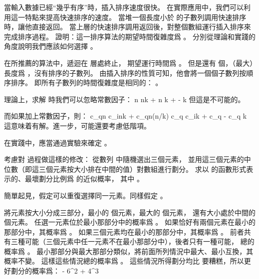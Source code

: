 \startEXERCISE
當輸入數據已經“幾乎有序”時，插入排序速度很快。
在實際應用中，我們可以利用這一特點來提高快速排序的速度。
當堆一個長度小於  的子數列調用快速排序時，讓他直接返回。
當上層的快速排序調用返回後，對整個數組運行插入排序來完成排序過程。
證明：這一排序算法的期望時間復雜度爲 。
分別從理論和實踐的角度說明我們應該如何選擇 。
\stopEXERCISE

\startANSWER
在所推薦的算法中，遞迴在  層處終止，
期望運行時間爲 。
但是還有  個，（最大）長度爲 ，沒有排序的子數列。
由插入排序的性質可知，他會將一個個子數列按順序排序。
即所有子數列的時間復雜度是相同的： 。

理論上，求解  時我們可以忽略常數因子：
\startformula\startmathalignment[n=1]
\NC n \ge nk + n \NR
\NC \Downarrow \NR
\NC {} \ge k +  -  \NR
\NC \Downarrow \NR
\NC {} \ge k \NR
\stopmathalignment\stopformula
但這是不可能的。

而如果加上常數因子，則：
\startformula\startmathalignment[n=1]
\NC c_qn \ge c_ink + c_qn\lg(n/k) \NR
\NC \Downarrow \NR
\NC c_q \ge c_ik + c_q - c_q \NR
\NC \Downarrow \NR
\NC {} \ge {}k \NR
\stopmathalignment\stopformula
這意味着有解。進一步，可能還要考慮低階項。

在實踐中，應當通過實驗來確定 。
\stopANSWER

考慮對  過程做這樣的修改：
從數列  中隨機選出三個元素，
並用這三個元素的中位數（即這三個元素按大小排在中間的值）對數組進行劃分。
求以 \m{\alpha} 的函數形式表示的、最壞劃分比例爲  的近似概率，
其中 。
\stopEXERCISE

\startANSWER
簡單起見，假定可以重復選擇同一元素。同樣假定 。

將元素按大小分成三部分，最小的  個元素，最大的  個元素，
還有大小處於中間的  個元素。
任選一元素位於最小那部分中的概率爲 。
如果恰好有兩個元素在最小的那部分中，其概率爲 。
如果三個元素均在最小的那部分中，其概率爲 。
前者共有三種可能（三個元素中任一元素不在最小那部分中），後者只有一種可能，
總的概率爲 。
最小那部分與最大那部分類似，將前面所列情況中最大、最小互換，其概率不變。
這樣這些情況總的概率爲 。
這些情況所得劃分均比  要糟糕，所以更好劃分的概率爲：
 - 6\alpha^2 + 4\alpha^3
\stopformula
\stopANSWER
